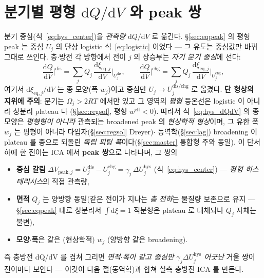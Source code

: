 \documentclass[11pt,a4paper]{article}
\newcommand{\dd}{\mathrm{d}}
\newcommand{\eff}{\mathrm{eff}}
\newcommand{\eq}{\mathrm{eq}}
\newcommand{\dis}{\mathrm{dis}}
\newcommand{\chg}{\mathrm{chg}}
\newcommand{\hys}{\mathrm{hys}}
\begin{document}
\section{분기별 평형 $\dd Q/\dd V$ 와 peak 쌍}\label{sec:hys_peak}
분기 중심(식~\eqref{eq:hys_center})을 \emph{관측량} $\dd Q/\dd V$ 로 옮긴다. \S\ref{sec:eqpeak} 의 평형 peak 는
중심 $U_j$ 의 단상 logistic 식~\eqref{eq:logistic} 이었다 — 그 유도는 중심값만 바꿔 그대로 쓰인다. 충$\cdot$방전
각 방향에서 전이 $j$ 의 상승부는 \emph{자기 분기 중심}에 선다:
\begin{equation}
\frac{\dd Q}{\dd V}\Big|^{\dis}=\sum_j Q_j\,\frac{\dd\xi_{\eq,j}}{\dd V}\Big|_{U_j^\dis},\qquad
\frac{\dd Q}{\dd V}\Big|^{\chg}=\sum_j Q_j\,\frac{\dd\xi_{\eq,j}}{\dd V}\Big|_{U_j^\chg},
\label{eq:hys_dQdV}
\end{equation}
여기서 $\dd\xi_{\eq,j}/\dd V$ 는 종 모양(폭 $w_j$)이고 중심만 $U_j\to U_j^{\dis/\chg}$ 로 옮겼다. \textbf{단 형상의
지위에 주의}: 분기는 $\Omega_j>2RT$ 에서만 있고 그 영역의 \emph{평형} 등온선은 logistic 이 아니라 상분리 plateau 다
(\S\ref{sec:regsol}, 평형 $w^\eff<0$). 따라서 식~\eqref{eq:hys_dQdV} 의 종 모양은 \emph{평형형이 아니라} 관측되는
broadened peak 의 \emph{현상학적 형상}이며, 그 유한 폭 $w_j$ 는 평형이 아니라 다입자(\S\ref{sec:regsol} Dreyer)$\cdot$
동역학(\S\ref{sec:lag}) broadening 이 plateau 를 종으로 되돌린 \emph{독립 피팅 폭}이다(\S\ref{sec:master} 통합형 주와
동일). 이 단서 하에 한 전이는 ICA 에서 \textbf{peak 쌍}으로 나타나며, 그 쌍의
\begin{itemize}[leftmargin=1.4em,itemsep=2pt]
\item \textbf{중심 갈림} $\Delta V_{\mathrm{peak},j}=U_j^\dis-U_j^\chg=\gamma_j\,\Delta U_j^\hys$ (식~\eqref{eq:hys_center}) —
  \emph{평형 히스테리시스}의 직접 관측량,
\item \textbf{면적} $Q_j$ 는 양방향 동일(같은 전이가 지나는 \emph{총 전하}는 물질량 보존으로 유지 — \S\ref{sec:eqpeak}
  대로 상분리서 $\int\dd\xi=1$ 적분형은 plateau 로 대체되나 $Q_j$ 자체는 불변),
\item \textbf{모양$\cdot$폭}은 같은 (현상학적) $w_j$ (양방향 같은 broadening).
\end{itemize}
즉 충방전 dQ/dV 를 겹쳐 그리면 \emph{면적$\cdot$폭이 같고 중심만 $\gamma_j\Delta U_j^\hys$ 어긋난} 거울 쌍이 전이마다 보인다 —
이것이 다음 절(동역학)과 합쳐 실측 충방전 ICA 를 만든다.

\end{document}

